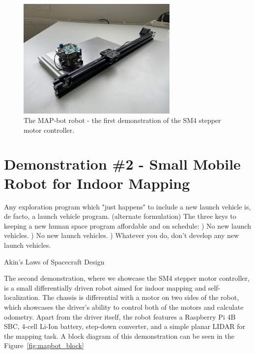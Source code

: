 \begin{figure}[H]
    \centering
    \includegraphics[width=0.7\textwidth]{obrazky/rail}
    \caption{The MAP-bot robot - the first demonstration of the SM4 stepper motor controller.}
    \label{fig:rail_demonstrator}
\end{figure}

\section{Demonstration \#2 - Small Mobile Robot for Indoor Mapping}
\label{sec:dem1}
\epigraph{
    Any exploration program which "just happens" to include a new launch vehicle is, de facto, a launch vehicle program. \newline\newline
    (alternate formulation) The three keys to keeping a new human space program affordable and on schedule: )  No new launch vehicles. )  No new launch vehicles. )  Whatever you do, don't develop any new launch vehicles.}{Akin's Laws of Spacecraft Design\cite{akin_akins_nodate}}

The second demonstration, where we showcase the SM4 stepper motor controller, is a small differentially driven robot aimed for indoor mapping and self-localization.
The chassis is differential with a motor on two sides of the robot, which showcases the driver's ability to control both of the motors and calculate odometry.
Apart from the driver itself, the robot features a Raspberry Pi 4B SBC, 4-cell Li-Ion battery, step-down converter, and a simple planar LIDAR for the mapping task.
A block diagram of this demonstration can be seen in the Figure~\ref{fig:mapbot_block}

